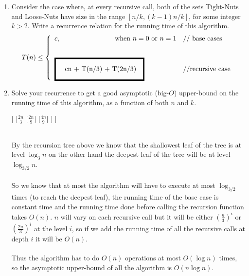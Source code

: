 \documentclass[11pt]{article}
\newcommand{\fillinblankmathsoln}[1]{\begingroup\setlength{\fboxsep}{1em}\setlength{\fboxrule}{2pt}\fbox{{#1}}\endgroup}
\def\question#1{\red{#1}}
\def\soln#1{\par\blu{#1}} %
\def\blu#1{{\color{blu}#1}}
\def\red#1{{\color{red}#1}}
\begin{document}
\begin{enumerate}
\item Consider  the case  where,  at  every recursive  call,  both  of the  sets
Tight-Nuts and  Loose-Nuts have size  in the range $[n/k,  (k-1)n/k]$, for
some  integer $k  > 2$.  
\question{Write  a recurrence  relation for the running time of this algorithm.}
\[
   T(n) \le \left\{ \begin{array}{ll} 
                    c, \qquad \qquad \qquad \qquad\mbox{when $n=0$ or $n=1$} & \mbox{// base cases} \\[.3in]
                    \fillinblankmathsoln{ cn + T(n/3) + T(2n/3)} & // \mbox{recursive case} \\
                    \end{array} \right.
   \]

\item \question{Solve your recurrence to get a good asymptotic (big-$O$) upper-bound on the  running time of this algorithm, as a function of both $n$ and $k$.}
\soln{
   \begin{forest}
      [n
        [$\frac{n}{3}$
         [$\frac{n}{9}$]
         [$\frac{2n}{9}$]
        ]
        [$\frac{2n}{3}$
         [$\frac{2n}{9}$]
         [$\frac{4n}{9}$]
        ]
      ]
    \end{forest} \\
   By the recursion tree above we know that the shallowest leaf of the tree is at level 
   $\log_{3} n$ on the other hand the deepest leaf of the tree will be at level $\log_{3/2} n$. 
   \\ \\ 
   So we know that at most the algorithm will have to execute at most $\log_{3/2}$ times 
   (to reach the deepest leaf), the running time of the base case is constant time and the 
   running time done before calling the recursion function takes $O(n)$. $n$ will vary on 
   each recursive call but it will be either $(\frac{n}{3})^i$ or $(\frac{2n}{3})^i$ at the 
   level $i$, so if we add the running time of all the recursive calls at depth $i$ it will be 
   $O(n)$. 
   \\ \\ 
   Thus the algorithm has to do $O(n)$ operations at most $O(\log n)$ times, so the 
   asymptotic upper-bound of all the algorithm is $O(n \log n)$.
}
\end{enumerate}
\end{document}
